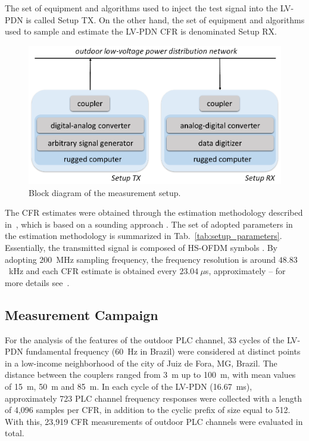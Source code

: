 \documentclass[journal]{IEEEtran}
\begin{document}
The set of equipment and algorithms used to inject the test signal into the \ac{LV-PDN} is called Setup TX. On the other hand, the set of equipment and algorithms used to sample and estimate the \ac{LV-PDN} \ac{CFR} is denominated Setup RX.

\begin{figure}[htb]
\begin{centering}
    \includegraphics[scale=.6]{Figuras/setups.eps}
    \caption{Block diagram of the measurement setup.}
    \label{fig:setup}
\end{centering}
\end{figure}

The \ac{CFR} estimates were obtained through the estimation methodology described in~\cite{Oliveira2014}, which is based on a sounding approach \cite{Parsons1991}. The set of adopted parameters in the estimation methodology is summarized in Tab.~\ref{tab:setup_parameters}.
Essentially, the transmitted signal is composed of \ac{HS-OFDM} symbols \cite{Ribeiro2014a}. By adopting  $200$~MHz sampling frequency, the frequency resolution is around $48.83$~kHz and each \ac{CFR} estimate is obtained every $23.04~\mu$s, approximately -- for more details see~\cite{Oliveira2013a}. 

\subsection{Measurement Campaign}
For the analysis of the features of the outdoor PLC channel, 33 cycles of the \ac{LV-PDN} fundamental frequency (60~Hz in Brazil) were considered at distinct points in a low-income neighborhood of the city of Juiz de Fora, MG, Brazil. The distance between the couplers ranged from 3~m up to 100~m, with mean values of 15~m, 50~m and 85~m. In each cycle of the \ac{LV-PDN} (16.67~ms), approximately 723 PLC channel frequency responses were collected with a length of 4,096 samples per CFR, in addition to the cyclic prefix of size equal to 512. With this, 23,919 CFR measurements of outdoor PLC channels were evaluated in total.
\end{document}
